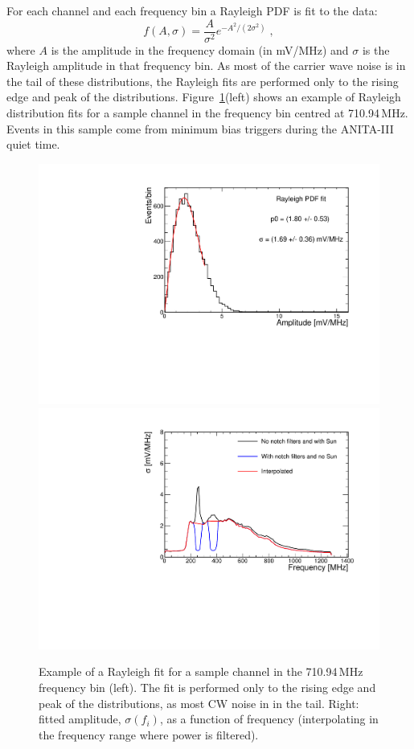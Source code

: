 For each channel and each frequency bin a Rayleigh PDF is fit to the data:
\begin{equation} 
  f(A, \sigma)=\dfrac{A}{\sigma^2}e^{-A^2/(2\sigma^2)} \;,
  \label{eq:rayleigh}
\end{equation}
\noindent where $A$ is the amplitude in the frequency domain (in mV/MHz) and $\sigma$ is the
Rayleigh amplitude in that frequency bin.
As most of the carrier wave noise is in the tail of these
distributions, the Rayleigh fits are performed only to the rising edge and peak of the distributions.
Figure~\ref{fig:rayleighFits}(left) shows an example of Rayleigh distribution fits for a sample channel in the frequency bin centred at 710.94\,MHz.
Events in this sample come from minimum bias triggers during the ANITA-III quiet time.
 
\begin{figure}[!h]\centering
  \includegraphics[width=.45\linewidth]{./Figs/RayleighExample.pdf}
  \includegraphics[width=.45\linewidth]{./Figs/RayleighSigma_1V_old.pdf}
  \caption{Example of a Rayleigh fit for a sample channel in the
    710.94\,MHz frequency bin (left). The fit is performed only to the rising edge and peak of the distributions, as most CW noise in in the tail. 
Right: fitted amplitude, $\sigma(f_i)$, as a
    function of frequency (interpolating in the frequency range where power is filtered). }
  \label{fig:rayleighFits}
\end{figure}

